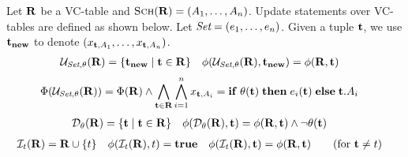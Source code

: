\begin{defi}
  Let $\mathbf{R}$ be a VC-table and $\textsc{Sch}(\mathbf{R}) = (A_1, \ldots, A_n)$. Update statements over VC-tables are defined as shown below. %
Let  $\textit{Set} = (e_1, \ldots, e_n)$. Given a tuple $\mathbf{t}$, we use  $\mathbf{t_{new}}$ to denote $(x_{\mathbf{t},A_1}, \ldots, x_{\mathbf{t},A_n})$.
  \begin{align*}
    \mathcal{U}_{\textit{Set},\theta}(\mathbf{R})   &= \{ \mathbf{t_{new}} \mid \mathbf{t} \in \mathbf{R} \}
    &\phi(\mathcal{U}_{\textit{Set},\theta}(\mathbf{R}), \mathbf{t_{new}} )  &= \phi(\mathbf{R},\mathbf{t})
  \end{align*}
  \begin{align*}
    &\Phi(\mathcal{U}_{\textit{Set},\theta}(\mathbf{R})) = \Phi(\mathbf{R}) \land \bigwedge_{\mathbf{t} \in \mathbf{R}} \bigwedge_{i=1}^{n} x_{\mathbf{t},A_i} = \mathbf{if}\thickspace \theta(\mathbf{t}) \thickspace \mathbf{then} \thickspace e_i(\mathbf{t}) \thickspace \mathbf{else} \thickspace \mathbf{t}.A_i
    \end{align*}
  \begin{align*}
    \mathcal{D}_{\theta}(\mathbf{R})                & = \{ \mathbf{t} \mid \mathbf{t} \in \mathbf{R} \}                                                                                                                                 &
    \phi(\mathcal{D}_{\theta}(\mathbf{R}), \mathbf{t}) &= \phi(\mathbf{R}, \mathbf{t}) \land \neg \theta(\mathbf{t})
  \end{align*}
  \begin{align*}
    \ins{t}(\vcrel)                        & = \vcrel \union \{ t \}                                                                                                                                &
\lcond(\ins{t}(\vcrel),t)  &= \T
    & \lcond(\ins{t}(\vcrel),\vct) &= \lcond(\vcrel,\vct) \tag{for $\vct \neq t$}

\end{align*}
\end{defi}

